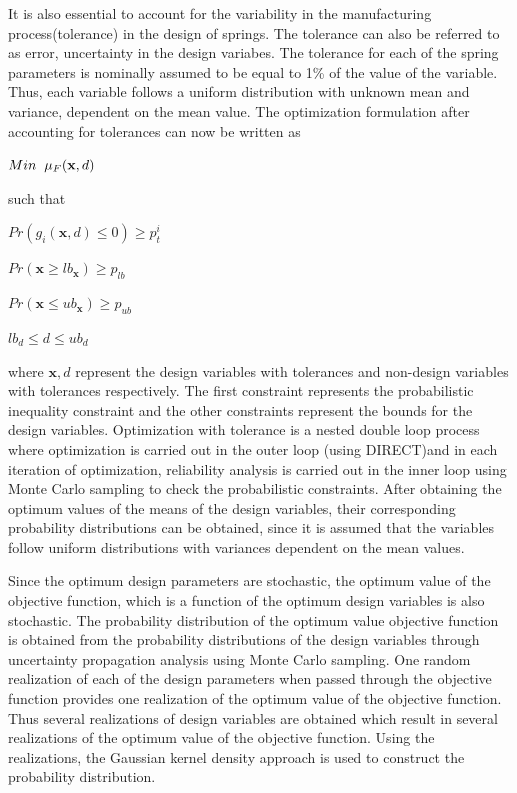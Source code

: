 \documentclass[10pt]{article}
\begin{document}
\hspace{5 mm} It is also essential to account for the variability in the manufacturing process(tolerance) in the design of springs. The tolerance can also be referred to as error, uncertainty in the design variabes. The tolerance for each of the spring parameters is nominally assumed to be equal to 1\% of the value of the variable. Thus, each variable follows a uniform distribution with unknown mean and variance, dependent on the mean value. The optimization formulation after accounting for tolerances can now be written as 

\centerline{$Min \hspace{2mm} \mu_{F} (\textbf{x},d)$}

such that

\centerline{$Pr(g_{i}(\textbf{x},d) \leq 0)\geq p_{t}^{i}$}
\centerline{$Pr(\textbf{x} \geq lb_{\textbf{x}})\geq p_{lb}$}
\centerline{$Pr(\textbf{x} \leq ub_{\textbf{x}})\geq p_{ub}$}
\centerline{$lb_{d} \leq d \leq ub_{d}$}

\noindent where $\mathbf{x},d$ represent the design variables with tolerances and non-design variables with tolerances respectively. The first constraint represents the probabilistic inequality constraint and the other constraints represent the bounds for the design variables. Optimization with tolerance is a nested double loop process where optimization is carried out in the outer loop (using DIRECT)and in each iteration of optimization, reliability analysis is carried out in the inner loop using Monte Carlo sampling to check the probabilistic constraints. After obtaining the optimum values of the means of the design variables, their corresponding probability distributions can be obtained, since it is assumed that the variables follow uniform distributions with variances dependent on the mean values. 


\begin{flushleft}
\hspace{5 mm} Since the optimum design parameters are stochastic, the optimum value of the objective function, which is a function of the optimum design variables is also stochastic. The probability distribution of the optimum value objective function is obtained from the probability distributions of the design variables through uncertainty propagation analysis using Monte Carlo sampling. One random realization of each of the design parameters when passed through the objective function provides one realization of the optimum value of the objective function. Thus several realizations of design variables are obtained which result in several realizations of the optimum value of the objective function. Using the realizations, the Gaussian kernel density approach is used to construct the probability distribution.

\end{flushleft}
\end{document}
